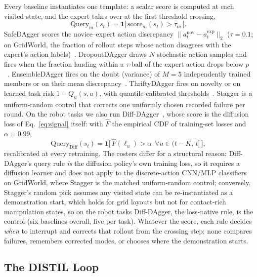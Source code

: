 \documentclass[letterpaper]{article} %
\begin{document}
Every baseline instantiates one template: a scalar score is computed at each
visited state, and the expert takes over at the first threshold crossing,
\begin{equation}
\mathrm{Query}_m(s_t)=\mathbf{1}\big[\,\mathrm{score}_m(s_t)>\tau_m\,\big].
\label{eq:query}
\end{equation}
SafeDAgger scores the novice--expert action discrepancy
$\|a^{\mathrm{nov}}_t-a^{\mathrm{exp}}_t\|_2$ ($\tau{=}0.1$;
on GridWorld, the fraction of rollout steps whose action disagrees with the
expert's action labels)~\citep{zhang2017safedagger}. DropoutDAgger draws $N$ stochastic action
samples and fires when the fraction landing within a $\tau$-ball of the
expert action drops below $p$~\citep{menda2017dropoutdagger,gal2016dropout}.
EnsembleDAgger fires on the doubt (variance) of $M{=}5$ independently trained
members or on their mean
discrepancy~\citep{menda2019ensembledagger,lakshminarayanan2017ensembles}.
ThriftyDAgger fires on novelty or on learned task risk $1-Q_\psi(s,a)$, with
quantile-calibrated thresholds~\citep{hoque2021thriftydagger}. Stagger is a
uniform-random control that corrects one uniformly chosen recorded failure
per round. On the robot tasks we also run
Diff-DAgger~\citep{lee2025diffdagger}, whose score is the diffusion loss of
Eq.~\ref{eq:signal} itself: with $\hat F$ the empirical CDF of training-set
losses and $\alpha{=}0.99$,
\begin{equation}
\mathrm{Query}_{\mathrm{Diff}}(s_t)=
\mathbf{1}\big[\,\hat F(\ell_u)>\alpha\ \ \forall u\in(t{-}K,\,t]\,\big],
\label{eq:diffdagger}
\end{equation}
recalibrated at every retraining. The rosters differ for a structural
reason: Diff-DAgger's query rule \emph{is} the diffusion policy's own
training loss, so it requires a diffusion learner and does not apply to the
discrete-action CNN/MLP classifiers on GridWorld, where Stagger is the
matched uniform-random control; conversely, Stagger's random pick assumes
any visited state can be re-instantiated as a demonstration start, which
holds for grid layouts but not for contact-rich manipulation states, so on
the robot tasks Diff-DAgger, the loss-native rule, is the control (six
baselines overall, five per task). Whatever the
score, each rule decides \emph{when} to interrupt and corrects that rollout
from the crossing step; none compares failures, remembers corrected modes,
or chooses where the demonstration starts.

\subsection{The DISTIL Loop}
\label{sec:distil}
\end{document}
